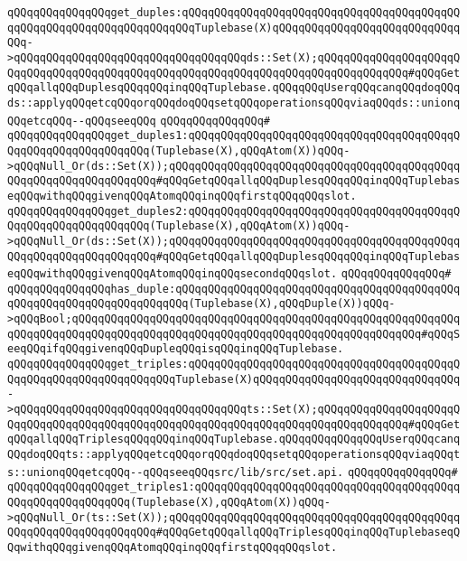 \newline
\newline
\verb|qQQqqQQqqQQqqQQqget_duples:qQQqqQQqqQQqqQQqqQQqqQQqqQQqqQQqqQQqqQQqqQQqqQQqqQQqqQQqqQQqqQQqqQQqqQQqTuplebase(X)qQQqqQQqqQQqqQQqqQQqqQQqqQQqqQQq->qQQqqQQqqQQqqQQqqQQqqQQqqQQqqQQqqQQqds::Set(X);qQQqqQQqqQQqqQQqqQQqqQQqqQQqqQQqqQQqqQQqqQQqqQQqqQQqqQQqqQQqqQQqqQQqqQQqqQQqqQQqqQQq#qQQqGetqQQqallqQQqDuplesqQQqqQQqinqQQqTuplebase.qQQqqQQqUserqQQqcanqQQqdoqQQqds::applyqQQqetcqQQqorqQQqdoqQQqsetqQQqoperationsqQQqviaqQQqds::unionqQQqetcqQQq--qQQqseeqQQq|\newline
\verb|qQQqqQQqqQQqqQQq#|\newline
\verb|qQQqqQQqqQQqqQQqget_duples1:qQQqqQQqqQQqqQQqqQQqqQQqqQQqqQQqqQQqqQQqqQQqqQQqqQQqqQQqqQQqqQQq(Tuplebase(X),qQQqAtom(X))qQQq->qQQqNull_Or(ds::Set(X));qQQqqQQqqQQqqQQqqQQqqQQqqQQqqQQqqQQqqQQqqQQqqQQqqQQqqQQqqQQqqQQqqQQq#qQQqGetqQQqallqQQqDuplesqQQqqQQqinqQQqTuplebaseqQQqwithqQQqgivenqQQqAtomqQQqinqQQqfirstqQQqqQQqslot.|\newline
\verb|qQQqqQQqqQQqqQQqget_duples2:qQQqqQQqqQQqqQQqqQQqqQQqqQQqqQQqqQQqqQQqqQQqqQQqqQQqqQQqqQQqqQQq(Tuplebase(X),qQQqAtom(X))qQQq->qQQqNull_Or(ds::Set(X));qQQqqQQqqQQqqQQqqQQqqQQqqQQqqQQqqQQqqQQqqQQqqQQqqQQqqQQqqQQqqQQqqQQq#qQQqGetqQQqallqQQqDuplesqQQqqQQqinqQQqTuplebaseqQQqwithqQQqgivenqQQqAtomqQQqinqQQqsecondqQQqslot.|\newline
\verb|qQQqqQQqqQQqqQQq#|\newline
\verb|qQQqqQQqqQQqqQQqhas_duple:qQQqqQQqqQQqqQQqqQQqqQQqqQQqqQQqqQQqqQQqqQQqqQQqqQQqqQQqqQQqqQQqqQQqqQQq(Tuplebase(X),qQQqDuple(X))qQQq->qQQqBool;qQQqqQQqqQQqqQQqqQQqqQQqqQQqqQQqqQQqqQQqqQQqqQQqqQQqqQQqqQQqqQQqqQQqqQQqqQQqqQQqqQQqqQQqqQQqqQQqqQQqqQQqqQQqqQQqqQQqqQQqqQQq#qQQqSeeqQQqifqQQqgivenqQQqDupleqQQqisqQQqinqQQqTuplebase.|\newline
\newline
\verb|qQQqqQQqqQQqqQQqget_triples:qQQqqQQqqQQqqQQqqQQqqQQqqQQqqQQqqQQqqQQqqQQqqQQqqQQqqQQqqQQqqQQqqQQqTuplebase(X)qQQqqQQqqQQqqQQqqQQqqQQqqQQqqQQq->qQQqqQQqqQQqqQQqqQQqqQQqqQQqqQQqqQQqts::Set(X);qQQqqQQqqQQqqQQqqQQqqQQqqQQqqQQqqQQqqQQqqQQqqQQqqQQqqQQqqQQqqQQqqQQqqQQqqQQqqQQqqQQq#qQQqGetqQQqallqQQqTriplesqQQqqQQqinqQQqTuplebase.qQQqqQQqqQQqqQQqUserqQQqcanqQQqdoqQQqts::applyqQQqetcqQQqorqQQqdoqQQqsetqQQqoperationsqQQqviaqQQqts::unionqQQqetcqQQq--qQQqseeqQQqsrc/lib/src/set.api.|\newline
\verb|qQQqqQQqqQQqqQQq#|\newline
\verb|qQQqqQQqqQQqqQQqget_triples1:qQQqqQQqqQQqqQQqqQQqqQQqqQQqqQQqqQQqqQQqqQQqqQQqqQQqqQQqqQQq(Tuplebase(X),qQQqAtom(X))qQQq->qQQqNull_Or(ts::Set(X));qQQqqQQqqQQqqQQqqQQqqQQqqQQqqQQqqQQqqQQqqQQqqQQqqQQqqQQqqQQqqQQqqQQq#qQQqGetqQQqallqQQqTriplesqQQqinqQQqTuplebaseqQQqwithqQQqgivenqQQqAtomqQQqinqQQqfirstqQQqqQQqslot.|\newline
